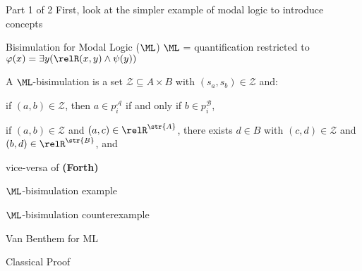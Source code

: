 \documentclass[169]{beamer}
\begin{document}
\begin{frame}{Part 1 of 2}
  First, look at the simpler example of modal logic to introduce concepts
\end{frame}

\begin{frame}[label=current]{Bisimulation for Modal Logic ($\ML$)}
  $\ML$ = quantification restricted to $\varphi(x) = \exists{y} (\relR(x,y) \land \psi(y))$
  \vspace{0.5em}
  \begin{definition}
    A $\ML$-bisimulation is a set $\mathcal{Z} \subseteq A \times B$ with $(s_{a}, s_{b}) \in \mathcal{Z}$ and:
    \begin{description}[itemsep=0.5em]
      \item[(Atomic Harmony)] if $(a,b) \in \mathcal{Z}$, then $a \in p_{i}^{\mathcal{A}}$ if and only if $b \in p_{i}^{\mathcal{B}}$,
      \item[(Forth)] if $(a,b) \in \mathcal{Z}$ and $(a,c) \in \relR^{\str{A}}$, there exists $d \in B$ with $(c,d) \in \mathcal{Z}$ and $(b,d) \in \relR^{\str{B}}$, and
      \item[(Back)] vice-versa of \textbf{(Forth)}
    \end{description}
  \end{definition}
\end{frame}

\begin{frame}[label=current]{$\ML$-bisimulation example}
  \begin{center}
    
  \end{center}
\end{frame}

\begin{frame}[label=current]{$\ML$-bisimulation counterexample}
  \begin{center}
    
  \end{center}
\end{frame}

\begin{frame}{Van Benthem for ML}

\end{frame}

\begin{frame}{Classical Proof}

\end{frame}
\end{document}

